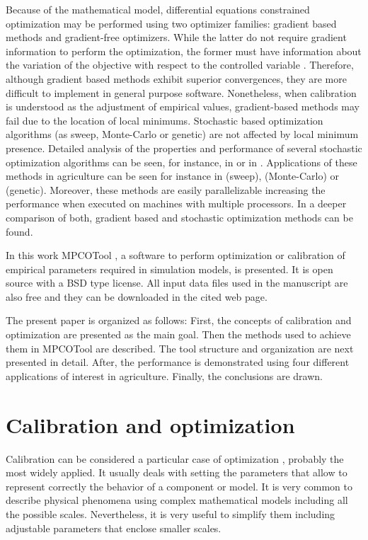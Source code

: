 \documentclass[review,authoryear]{elsarticle}
\begin{document}
Because of the mathematical model, differential equations constrained
optimization may be performed using two optimizer families: gradient based
methods and gradient-free optimizers. While the latter do not require gradient
information to perform the optimization, the former must have information about
the variation of the objective with respect to the controlled variable
\citep{Lacasta15}. Therefore, although gradient based methods exhibit superior
convergences, they are more difficult to implement in general purpose software.
Nonetheless, when calibration is understood as the adjustment of empirical
values, gradient-based methods may fail due to the location of local minimums.
Stochastic based optimization algorithms (as sweep, Monte-Carlo or genetic) are
not affected by local minimum presence. 
Detailed analysis of the properties and performance of several stochastic
optimization algorithms can be seen, for instance, in \citet{Back96} or in
\citet{HauptHaupt04}.
Applications of these methods in
agriculture can be seen for instance in \citet{JaviSurcos2} (sweep),
\citet{Ouazaa15} (Monte-Carlo) or \citet{Ebrahimiam13} (genetic). Moreover,
these methods are easily parallelizable increasing the performance when executed
on machines with multiple processors. In \cite{Lacasta15} a deeper comparison of
both, gradient based and stochastic optimization methods can be found.

In this work MPCOTool \citep{MPCOToolGit}, a software to perform
optimization or calibration of empirical parameters required in simulation
models, is presented. It is open source with a BSD type license. All input data
files used in the manuscript are also free and they can be downloaded in the
cited web page.

The present paper is organized as follows: First, the concepts of calibration
and optimization are presented as the main goal. Then the methods used to
achieve them in MPCOTool are described. The tool structure and organization
are next presented in detail. After, the performance is demonstrated using
four different applications of interest in agriculture. Finally, the conclusions
are drawn.

\section{Calibration and optimization}

Calibration can be considered a particular case of optimization
\citep{WrightNocedal99}, probably the most widely applied. It usually deals with
setting the parameters that allow to represent correctly the behavior of a
component or model. It is very common to describe physical phenomena using
complex mathematical models including all the possible scales. Nevertheless, it
is very useful to simplify them including adjustable parameters that enclose
smaller scales.
\end{document}
